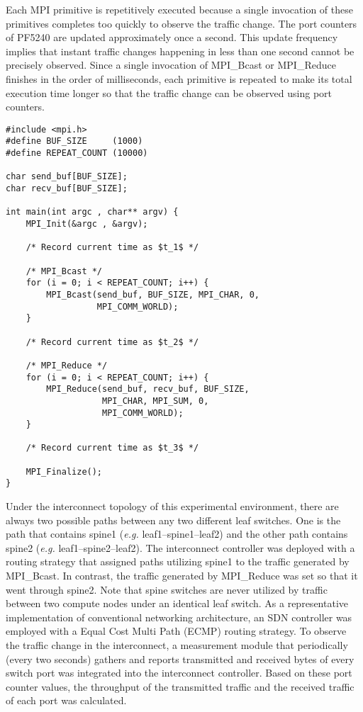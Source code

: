 Each MPI primitive is repetitively executed because a single invocation
of these primitives completes too quickly to observe the traffic change.
The port counters of PF5240 are updated approximately once a second.
This update frequency implies that instant traffic changes happening in less
than one second cannot be precisely observed. Since a single invocation of
MPI\_Bcast or MPI\_Reduce finishes in the order of milliseconds, each
primitive is repeated to make its total execution time longer so that the
traffic change can be observed using port counters.

\begin{lstlisting}[caption={Source code of MPI application}, label=lst:sync-mpi-app, float=htbp]
#include <mpi.h>
#define BUF_SIZE     (1000)
#define REPEAT_COUNT (10000)

char send_buf[BUF_SIZE];
char recv_buf[BUF_SIZE];

int main(int argc , char** argv) {
    MPI_Init(&argc , &argv);

    /* Record current time as $t_1$ */

    /* MPI_Bcast */
    for (i = 0; i < REPEAT_COUNT; i++) {
        MPI_Bcast(send_buf, BUF_SIZE, MPI_CHAR, 0,
                  MPI_COMM_WORLD);
    }

    /* Record current time as $t_2$ */

    /* MPI_Reduce */
    for (i = 0; i < REPEAT_COUNT; i++) {
        MPI_Reduce(send_buf, recv_buf, BUF_SIZE,
                   MPI_CHAR, MPI_SUM, 0,
                   MPI_COMM_WORLD);
    }

    /* Record current time as $t_3$ */

    MPI_Finalize();
}
\end{lstlisting}

Under the interconnect topology of this experimental environment, there
are always two possible paths between any two different leaf switches.
One is the path that contains spine1 (\emph{e.g.} leaf1--spine1--leaf2) and
the other path contains spine2 (\emph{e.g.} leaf1--spine2--leaf2). The
interconnect controller was deployed with a routing strategy that assigned
paths utilizing spine1 to the traffic generated by MPI\_Bcast. In contrast,
the traffic generated by MPI\_Reduce was set so that it went through spine2.
Note that spine switches are never utilized by traffic between two compute
nodes under an identical leaf switch. As a representative implementation of
conventional networking architecture, an SDN controller was employed with a
Equal Cost Multi Path (ECMP) routing strategy. To observe the traffic change
in the interconnect, a measurement module that periodically (every two
seconds) gathers and reports transmitted and received bytes of every switch
port was integrated into the interconnect controller. Based on these port
counter values, the throughput of the transmitted traffic and the received
traffic of each port was calculated.

